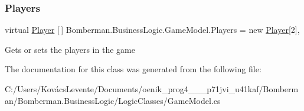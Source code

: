 \mbox{\label{class_bomberman_1_1_business_logic_1_1_game_model_a558c278098b639d6b16e3495ed9a2202}} 
\subsubsection{\texorpdfstring{Players}{Players}}
{\footnotesize\ttfamily virtual \mbox{\hyperlink{class_bomberman_1_1_model_1_1_player}{Player}} \mbox{[}$\,$\mbox{]} Bomberman.\+Business\+Logic.\+Game\+Model.\+Players = new \mbox{\hyperlink{class_bomberman_1_1_model_1_1_player}{Player}}\mbox{[}2\mbox{]}\hspace{0.3cm}{\ttfamily [get]}, {\ttfamily [set]}}



Gets or sets the players in the game 



The documentation for this class was generated from the following file\+:\begin{DoxyCompactItemize}
\item 
C\+:/\+Users/\+Kovács\+Levente/\+Documents/oenik\+\_\+prog4\+\_\+\_\+\_\+p71jvi\+\_\+u41kaf/\+Bomberman/\+Bomberman.\+Business\+Logic/\+Logic\+Classes/Game\+Model.\+cs\end{DoxyCompactItemize}
